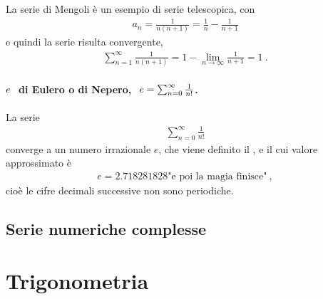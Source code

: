 \documentclass[letterpaper,10pt,english]{jupyterBook}
\begin{document}
\sphinxAtStartPar
La serie di Mengoli è un esempio di serie telescopica, con
\begin{equation*}
\begin{split}a_n = \frac{1}{n(n+1)} = \frac{1}{n} - \frac{1}{n+1}\end{split}
\end{equation*}
\sphinxAtStartPar
e quindi la serie risulta convergente,
\begin{equation*}
\begin{split}\sum_{n=1}^{\infty} \frac{1}{n(n+1)} = 1 - \lim_{n \rightarrow \infty} \frac{1}{n+1} = 1 \ .\end{split}
\end{equation*}\subsubsection*{\protect\(e\ \protect\) di Eulero o di Nepero, \protect\(\ e = \sum_{n=0}^{\infty} \frac{1}{n!}\protect\).}

\sphinxAtStartPar
La serie
\begin{equation*}
\begin{split}\sum_{n=0}^{\infty} \frac{1}{n!}\end{split}
\end{equation*}
\sphinxAtStartPar
converge a un numero irrazionale \(e\), che viene definito il , e il cui valore approssimato è
\begin{equation*}
\begin{split}e = 2.718281828\text{"e poi la magia finisce"} \ ,\end{split}
\end{equation*}
\sphinxAtStartPar
cioè le cifre decimali successive non sono periodiche.


\section{Serie numeriche complesse}
\label{\detokenize{ch/series:serie-numeriche-complesse}}
\sphinxstepscope


\chapter{Trigonometria}
\label{\detokenize{ch/trigonometry:trigonometria}}\label{\detokenize{ch/trigonometry:math-hs-trigonometry}}\label{\detokenize{ch/trigonometry::doc}}
\end{document}
